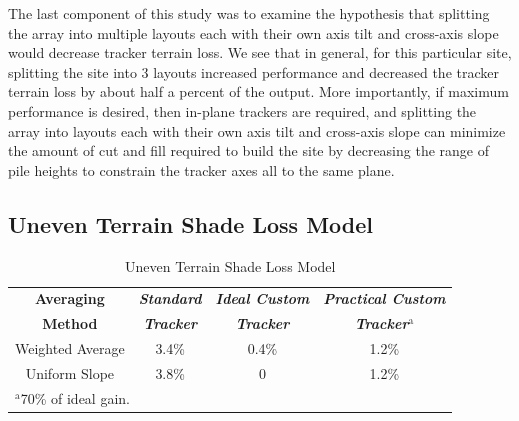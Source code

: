 \documentclass[conference]{IEEEtran}
\begin{document}
The last component of this study was to examine the hypothesis that splitting the array into multiple layouts each with their own axis tilt and cross-axis slope would decrease tracker terrain loss. We see that in general, for this particular site, splitting the site into 3 layouts increased performance and decreased the tracker terrain loss by about half a percent of the output. More importantly, if maximum performance is desired, then in-plane trackers are required, and splitting the array into layouts each with their own axis tilt and cross-axis slope can minimize the amount of cut and fill required to build the site by decreasing the range of pile heights to constrain the tracker axes all to the same plane.

\subsection{Uneven Terrain Shade Loss Model}

\begin{table}[htbp]
\caption{Uneven Terrain Shade Loss Model}
\begin{center}
\begin{tabular}{|c|c|c|c|}
\hline
\textbf{Averaging}& \textbf{\textit{Standard}}& \textbf{\textit{Ideal Custom}} & \textbf{\textit{Practical Custom }} \\
\textbf{Method}& \textbf{\textit{Tracker}} & \textbf{\textit{Tracker}}         & \textbf{\textit{Tracker$^{\mathrm{a}}$}} \\
\hline
Weighted Average& 3.4\%& 0.4\%& 1.2\% \\
\hline
Uniform Slope   & 3.8\%&     0& 1.2\% \\
\hline
\multicolumn{4}{l}{$^{\mathrm{a}}$70\% of ideal gain.}
\end{tabular}
\label{table:uneven-terrain}
\end{center}
\end{table}
\end{document}

